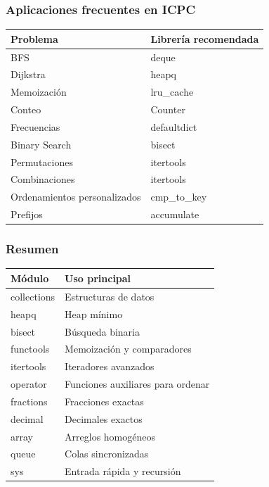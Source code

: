 \vspace{0.3cm}

\subsubsection{Aplicaciones frecuentes en ICPC}

\begin{center}
\begin{tabular}{|l|l|}
\hline
Problema & Librería recomendada \\ \hline
BFS & deque \\ \hline
Dijkstra & heapq \\ \hline
Memoización & lru\_cache \\ \hline
Conteo & Counter \\ \hline
Frecuencias & defaultdict \\ \hline
Binary Search & bisect \\ \hline
Permutaciones & itertools \\ \hline
Combinaciones & itertools \\ \hline
Ordenamientos personalizados & cmp\_to\_key \\ \hline
Prefijos & accumulate \\ \hline
\end{tabular}
\end{center}

\vspace{0.3cm}

\subsubsection*{Resumen}

\begin{center}
\begin{tabular}{|l|l|}
\hline
Módulo & Uso principal \\ \hline
collections & Estructuras de datos \\ \hline
heapq & Heap mínimo \\ \hline
bisect & Búsqueda binaria \\ \hline
functools & Memoización y comparadores \\ \hline
itertools & Iteradores avanzados \\ \hline
operator & Funciones auxiliares para ordenar \\ \hline
fractions & Fracciones exactas \\ \hline
decimal & Decimales exactos \\ \hline
array & Arreglos homogéneos \\ \hline
queue & Colas sincronizadas \\ \hline
sys & Entrada rápida y recursión \\ \hline
\end{tabular}
\end{center}
